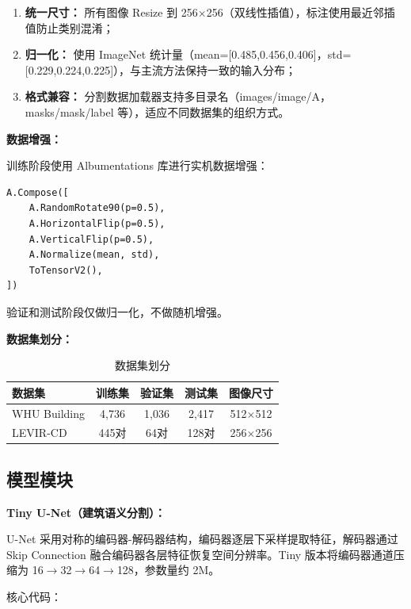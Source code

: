 \documentclass[12pt,a4paper]{article}
\begin{document}
\begin{enumerate}
    \item \textbf{统一尺寸：} 所有图像 Resize 到 256$\times$256（双线性插值），标注使用最近邻插值防止类别混淆；
    \item \textbf{归一化：} 使用 ImageNet 统计量（mean=[0.485,0.456,0.406]，std=[0.229,0.224,0.225]），与主流方法保持一致的输入分布；
    \item \textbf{格式兼容：} 分割数据加载器支持多目录名（images/image/A，masks/mask/label 等），适应不同数据集的组织方式。
\end{enumerate}

\textbf{数据增强：}

训练阶段使用 Albumentations 库进行实机数据增强：

\begin{lstlisting}
A.Compose([
    A.RandomRotate90(p=0.5),
    A.HorizontalFlip(p=0.5),
    A.VerticalFlip(p=0.5),
    A.Normalize(mean, std),
    ToTensorV2(),
])
\end{lstlisting}

验证和测试阶段仅做归一化，不做随机增强。

\textbf{数据集划分：}

\begin{table}[H]
\centering
\caption{数据集划分}
\label{tab:split}
\begin{tabular}{lcccc}
\toprule
数据集 & 训练集 & 验证集 & 测试集 & 图像尺寸 \\
\midrule
WHU Building & 4,736 & 1,036 & 2,417 & 512$\times$512 \\
LEVIR-CD & 445对 & 64对 & 128对 & 256$\times$256 \\
\bottomrule
\end{tabular}
\end{table}

\subsection{模型模块}

\textbf{Tiny U-Net（建筑语义分割）：}

U-Net 采用对称的编码器-解码器结构，编码器逐层下采样提取特征，解码器通过 Skip Connection 融合编码器各层特征恢复空间分辨率。Tiny 版本将编码器通道压缩为 16$\to$32$\to$64$\to$128，参数量约 2M。

核心代码：
\end{document}
